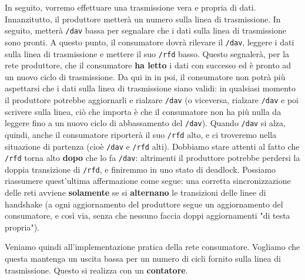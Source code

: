 \documentclass[a4paper,11pt]{article}
\begin{document}
In seguito, vorremo effettuare una trasmissione vera e propria di dati.
Innanzitutto, il produttore metterà un numero sulla linea di trasmissione.
In seguito, metterà \lstinline|/dav| bassa per segnalare che i dati sulla linea di trasmissione sono pronti.
A questo punto, il consumatore dovrà rilevare il \lstinline|/dav|, leggere i dati sulla linea di trasmissione e mettere il suo \lstinline|/rfd| basso.
Questo segnalerà, per la rete produttore, che il consumatore \textbf{ha letto}
 i dati con successo ed è pronto ad un nuovo ciclo di trasmissione.
Da qui in in poi, il consumatore non potrà più aspettarsi che i dati sulla linea di trasmissione siano validi: in qualsiasi momento il produttore potrebbe aggiornarli e rialzare \lstinline|/dav| (o viceversa, rialzare \lstinline|/dav| e poi scrivere sulla linea, ciò che importa è che il consumatore non ha più nulla da leggere fino a un nuovo ciclo di abbassamento del \lstinline|/dav|).
Quando \lstinline|/dav| si alza, quindi, anche il consumatore riporterà il suo \lstinline|/rfd| alto, e ci troveremo nella situazione di partenza (cioè \lstinline|/dav| e \lstinline|/rfd| alti).
Dobbiamo stare attenti al fatto che \lstinline|/rfd| torna alto \textbf{dopo} che lo fa \lstinline|/dav|: altrimenti il produttore potrebbe perdersi la doppia transizione di \lstinline|/rfd|, e finiremmo in uno stato di deadlock.
Possiamo riassumere quest'ultima affermazione come segue: una corretta sincronizzazione delle reti avviene \textbf{solamente} se si \textbf{alternano} le transizioni delle linee di handshake (a ogni aggiornamento del produttore segue un aggiornamento del consumatore, e così via, senza che nessuno faccia doppi aggiornamenti "di testa propria").

Veniamo quindi all'implementazione pratica della rete consumatore.
Vogliamo che questa mantenga un uscita bassa per un numero di cicli fornito sulla linea di trasmissione.
Questo si realizza con un \textbf{contatore}.
\end{document}

